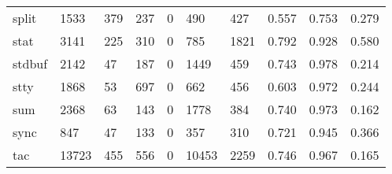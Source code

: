 \begin{longtable}{lp{1.3cm}p{1.3cm}p{1.3cm}p{1.3cm}p{1.3cm}p{1.3cm}p{1.3cm}p{1.3cm}p{1.3cm}}
split     &                   1533 &                                379 &                               237 &                                0 &                               490 &                             427 &                                   0.557 &                                  0.753 &                                0.279 \\
stat      &                   3141 &                                225 &                               310 &                                0 &                               785 &                            1821 &                                   0.792 &                                  0.928 &                                0.580 \\
stdbuf    &                   2142 &                                 47 &                               187 &                                0 &                              1449 &                             459 &                                   0.743 &                                  0.978 &                                0.214 \\
stty      &                   1868 &                                 53 &                               697 &                                0 &                               662 &                             456 &                                   0.603 &                                  0.972 &                                0.244 \\
sum       &                   2368 &                                 63 &                               143 &                                0 &                              1778 &                             384 &                                   0.740 &                                  0.973 &                                0.162 \\
sync      &                    847 &                                 47 &                               133 &                                0 &                               357 &                             310 &                                   0.721 &                                  0.945 &                                0.366 \\
tac       &                  13723 &                                455 &                               556 &                                0 &                             10453 &                            2259 &                                   0.746 &                                  0.967 &                                0.165 \\

\end{longtable}
